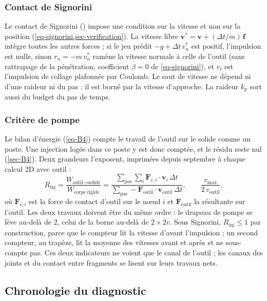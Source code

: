 \subsubsection{Contact de Signorini}

Le contact de Signorini () impose une condition sur la vitesse et non sur la position (\cref{eq-signorini,sec-verification}). La vitesse libre $\mathbf v^* = \mathbf v + (\Delta t/m)\,\mathbf f$ intègre toutes les autres forces ; si le jeu prédit $-g + \Delta t\,v_n^*$ est positif, l'impulsion est nulle, sinon $r_n = -m\,v_n^*$ ramène la vitesse normale à celle de l'outil (sans rattrapage de la pénétration, coefficient $\beta = 0$ de \cref{eq-signorini}), et $r_t$ est l'impulsion de collage plafonnée par Coulomb. Le saut de vitesse ne dépend ni d'une raideur ni du pas : il est borné par la vitesse d'approche. La raideur $k_p$ sort aussi du budget du pas de temps.

\subsubsection{Critère de pompe}

Le bilan d'énergie (\cref{eq-B4}) compte le travail de l'outil sur le solide comme un poste. Une injection logée dans ce poste y est donc comptée, et le résidu reste nul (\cref{sec-B4}). Deux grandeurs l'exposent, imprimées depuis septembre à chaque calcul 2D avec outil :
\begin{equation}
R_\text{inj} = \frac{W_{\text{outil}\to\text{solide}}}{W_\text{corps rigide}} = \frac{\sum_\text{pas}\sum_i \mathbf F_{c,i}\cdot\mathbf v_i\,\Delta t}{\sum_\text{pas} -\mathbf F_\text{outil}\cdot\mathbf v_\text{outil}\,\Delta t}, \qquad \frac{v_\text{max}}{2\,v_\text{outil}} ,
\label{eq-coupe-pompe}
\end{equation}
où $\mathbf F_{c,i}$ est la force de contact d'outil sur le nœud $i$ et $\mathbf F_\text{outil}$ la résultante sur l'outil. Les deux travaux doivent être du même ordre : le drapeau de pompe se lève au-delà de 2, celui de la borne au-delà de $2 \times 2v$. Sous Signorini, $R_\text{inj} \leq 1$ par construction, parce que le compteur lit la vitesse d'avant l'impulsion ; un second compteur, au trapèze, lit la moyenne des vitesses avant et après et ne sous-compte pas. Ces deux indicateurs ne voient que le canal de l'outil ; les canaux des joints et du contact entre fragments se lisent sur leurs travaux nets.

\subsection{Chronologie du diagnostic}

